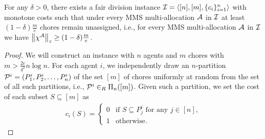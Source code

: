     \begin{theorem}
    \label{thm:chores_lowerbound}

 For any $\delta>0$, there exists a fair division instance $\mathcal{I} = \langle [n], [m], \{c_i\}_{i=1}^n \rangle$ with monotone costs such that under every MMS multi-allocation $\mathcal{A}$ in $\mathcal{I}$ at least $(1-\delta)\frac{m}{e}$ chores remain unassigned, i.e., for every MMS multi-allocation $\mathcal{A}$ in $\mathcal{I}$ we have $\left\|\chi^{\mathcal{A}}\right\|_z\geq (1-\delta)\frac{m}{e}$. 
\end{theorem}

\begin{proof}
    We will construct an instance with $n$ agents and $m$ chores with $m> \frac{2e}{\delta^2}n\log n$. For each agent $i$, we independently draw an $n$-partition $\mathcal{P}^i=(P^i_1,P^i_2,\dots,P^i_n)$ of the set $[m]$ of chores uniformly at random from the set of all such partitions, i.e., $\mathcal{P}^i \in_R \Pi_n([m])$. Given such a partition, we set the cost of each subset $S\subseteq [m]$ as 
    \begin{align*}
        c_i(S) =\begin{cases}
        0  & \text{if } S\subseteq P^i_j \text{ for any $j \in [n]$,}\\
        1  & \text{otherwise}.
    \end{cases}
    \end{align*}
    

\end{proof}
